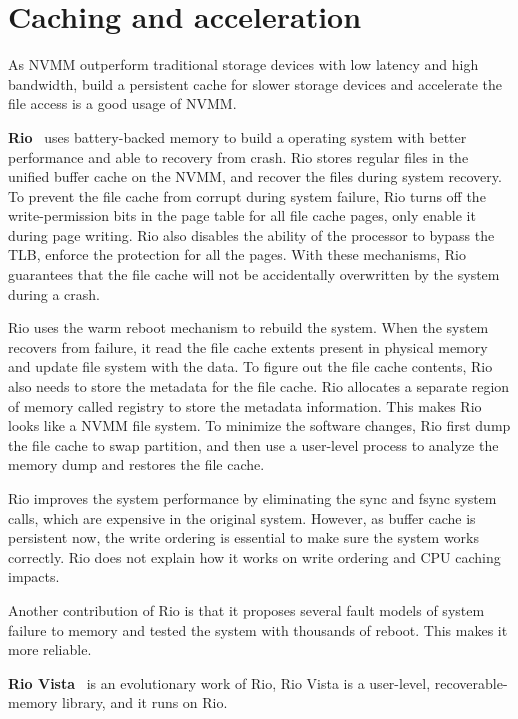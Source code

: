 \section{Caching and acceleration} 
\label{sec:caching}

As NVMM outperform traditional storage devices with low latency and high
bandwidth, build a persistent cache for slower storage devices and
accelerate the file access is a good usage of NVMM. 

\textbf{Rio}~\cite{riofilecache} uses battery-backed memory to build a
operating system
with better performance and able to recovery from crash. Rio stores regular
files in the unified buffer cache on the NVMM, and recover the files
during system recovery.
To prevent the file
cache from corrupt during system failure, Rio turns off the write-permission
bits in the page table for all file cache pages, only enable it during page
writing. Rio also disables the ability of the processor to bypass the TLB,
enforce the protection for all the pages. With these mechanisms, Rio guarantees
that the file cache will not be accidentally overwritten by the system during
a crash.

Rio uses the warm reboot mechanism to rebuild the system. When the system 
recovers from failure, it read the file cache extents present in physical memory
and update file system with the data. To figure out the file cache contents,
Rio also needs to store the metadata for the file cache. Rio allocates a
separate region of memory called registry to store the metadata information.
This makes Rio looks like a NVMM file system.
To minimize the software changes, Rio first dump the file cache to swap
partition, and then use a user-level process to analyze the memory dump
and restores the file cache.

Rio improves the system performance by eliminating the sync and fsync system
calls, which are expensive in the original system. However, as buffer cache
is persistent now, the write ordering is essential to make sure the system
works correctly. Rio does not explain how it works on write ordering and CPU
caching impacts.

Another contribution of Rio is that it proposes several fault models of system
failure to memory and tested the system with thousands of reboot. This makes
it more reliable.
 
\textbf{Rio Vista}~\cite{riovista} is an evolutionary work of Rio,
Rio Vista is a
user-level, recoverable-memory library, and it runs on Rio.


